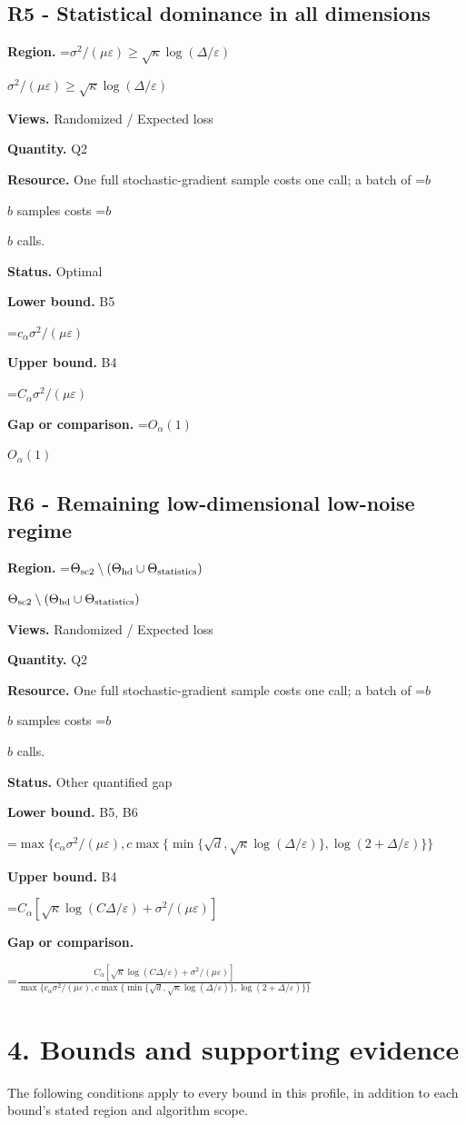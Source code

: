 \documentclass[10pt,a4paper]{article}
\newcommand{\AtlasMath}[1]{\par\begingroup\centering\setbox0=\hbox{$\displaystyle #1$}\ifdim\wd0>1.4\linewidth\typeout{ATLAS WIDE FORMULA: \the\wd0}\fi\ifdim\wd0>\linewidth\resizebox{\linewidth}{!}{\box0}\else\box0\fi\par\endgroup}
\newcommand{\AtlasInlineMath}[1]{\begingroup\setbox0=\hbox{$#1$}\ifdim\wd0>.4\linewidth\endgroup\AtlasMath{#1}\else\endgroup$#1$\fi}
\begin{document}
\subsection{R5 - Statistical dominance in all dimensions}
\textbf{Region.} \AtlasInlineMath{\sigma^2/(\mu\varepsilon)\ge \sqrt\kappa\log(\Delta/\varepsilon)}

\textbf{Views.} Randomized / Expected loss

\textbf{Quantity.} Q2

\textbf{Resource.} One full stochastic-gradient sample costs one call; a batch of \AtlasInlineMath{b} samples costs \AtlasInlineMath{b} calls.

\textbf{Status.} Optimal

\textbf{Lower bound.} B5

\AtlasMath{c_\alpha \sigma^2/(\mu\varepsilon)}
\textbf{Upper bound.} B4

\AtlasMath{C_\alpha \sigma^2/(\mu\varepsilon)}
\textbf{Gap or comparison.} \AtlasInlineMath{O_\alpha(1)}

\subsection{R6 - Remaining low-dimensional low-noise regime}
\textbf{Region.} \AtlasInlineMath{\Theta_{\rm sc2}\setminus(\Theta_{\rm hd}\cup\Theta_{\rm statistics})}

\textbf{Views.} Randomized / Expected loss

\textbf{Quantity.} Q2

\textbf{Resource.} One full stochastic-gradient sample costs one call; a batch of \AtlasInlineMath{b} samples costs \AtlasInlineMath{b} calls.

\textbf{Status.} Other quantified gap

\textbf{Lower bound.} B5, B6

\AtlasMath{\max\{c_\alpha \sigma^2/(\mu\varepsilon),c\max\{\min\{\sqrt d,\sqrt\kappa\log(\Delta/\varepsilon)\},\log(2+\Delta/\varepsilon)\}\}}
\textbf{Upper bound.} B4

\AtlasMath{C_\alpha[\sqrt\kappa\log(C\Delta/\varepsilon)+\sigma^2/(\mu\varepsilon)]}
\textbf{Gap or comparison.} 
\AtlasMath{\frac{C_\alpha[\sqrt\kappa\log(C\Delta/\varepsilon)+\sigma^2/(\mu\varepsilon)]}{\max\{c_\alpha \sigma^2/(\mu\varepsilon),c\max\{\min\{\sqrt d,\sqrt\kappa\log(\Delta/\varepsilon)\},\log(2+\Delta/\varepsilon)\}\}}}


\section{4. Bounds and supporting evidence}
The following conditions apply to every bound in this profile, in addition to each bound's stated region and algorithm scope.
\end{document}
